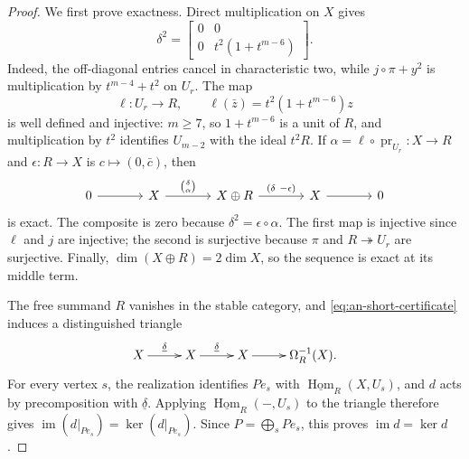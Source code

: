\documentclass[a4paper,11pt,reqno]{amsart}
\theoremstyle{definition}
\theoremstyle{plain}
\numberwithin{equation}{section}
\newcommand{\im}{\operatorname{im}}
\newcommand{\Hom}{\operatorname{Hom}}
\begin{document}
\begin{proof}
We first prove exactness.  Direct multiplication on \(X\) gives
\[
 \delta^2=
 \begin{bmatrix}0&0\\0&t^2(1+t^{m-6})\end{bmatrix}.
\]
Indeed, the off-diagonal entries cancel in characteristic two, while
\(j\circ \pi+y^2\) is multiplication by \(t^{m-4}+t^2\) on \(U_r\).
The map
\[
 \ell:U_r\longrightarrow R,
 \qquad \ell(\bar z)=t^2(1+t^{m-6})z
\]
is well defined and injective: \(m\ge7\), so \(1+t^{m-6}\) is a
unit of \(R\), and multiplication by \(t^2\) identifies
\(U_{m-2}\) with the ideal \(t^2R\).  If
\(\alpha=\ell\circ\operatorname{pr}_{U_r}:X\to R\) and
\(\epsilon:R\to X\) is \(c\mapsto(0,\bar c)\), then
\begin{equation}
\label{eq:an-short-certificate}
\begin{tikzcd}[column sep=3.6em]
 0 \arrow[r] & X \arrow[r,"{\binom{\delta}{\alpha}}"]
   & X\oplus R \arrow[r,"{(\delta\ -\epsilon)}"]
   & X \arrow[r] & 0
\end{tikzcd}
\end{equation}
is exact.  The composite is zero because
\(\delta^2=\epsilon\circ\alpha\).  The first map is injective since
\(\ell\) and \(j\) are injective; the second is surjective because
\(\pi\) and \(R\twoheadrightarrow U_r\) are surjective.  Finally,
\(\dim(X\oplus R)=2\dim X\), so the sequence is exact at its middle term.

The free summand \(R\) vanishes in the stable category, and
\eqref{eq:an-short-certificate} induces a distinguished triangle
\begin{equation*}
	\xymatrix@C=2.2pc{
		X\ar[r]^-{\underline{\delta}}&
		X\ar[r]^-{\underline{\delta}}&
		X\ar[r]&\Omega_R^{-1}(X).
	}
\end{equation*}
For every vertex \(s\), the realization identifies
\(Pe_s\) with \(\underline{\Hom}_R(X,U_s)\), and \(d\) acts by
precomposition with \(\underline\delta\).  Applying
\(\underline{\Hom}_R(-,U_s)\) to the triangle therefore gives
\(\im(d|_{Pe_s})=\ker(d|_{Pe_s})\).  Since
\(P=\bigoplus_sPe_s\), this proves \(\im d=\ker d\).


\end{proof}
\end{document}
